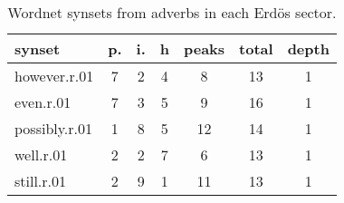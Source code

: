 \begin{table}[h!]
\begin{center}
\begin{tabular}{| l | c | c | c | c | c | c |}\hline
synset & p. & i. & h & peaks & total & depth \\\hline
however.r.01 & 7  & 2  & 4  & 8  & 13  & 1 \\\hline
even.r.01 & 7  & 3  & 5  & 9  & 16  & 1 \\\hline
possibly.r.01 & 1  & 8  & 5  & 12  & 14  & 1 \\\hline
well.r.01 & 2  & 2  & 7  & 6  & 13  & 1 \\\hline
still.r.01 & 2  & 9  & 1  & 11  & 13  & 1 \\\hline
\end{tabular}
\caption{Wordnet synsets from adverbs in each Erd\"os sector.}
\end{center}
\end{table}